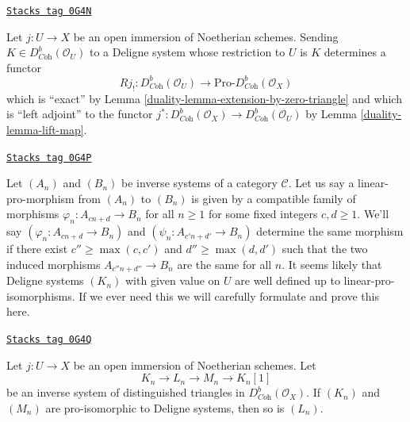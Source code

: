 \begin{remark}
\label{duality-remark-extension-by-zero}
\href{https://stacks.math.columbia.edu/tag/0G4N}{\texttt{Stacks tag 0G4N}}

Let $j : U \to X$ be an open immersion of Noetherian schemes.
Sending $K \in D^b_{\textit{Coh}}(\mathcal{O}_U)$ to a Deligne
system whose restriction to $U$ is $K$ determines a functor
$$
Rj_! :
D^b_{\textit{Coh}}(\mathcal{O}_U)
\longrightarrow
\text{Pro-}D^b_{\textit{Coh}}(\mathcal{O}_X)
$$
which is ``exact'' by Lemma \ref{duality-lemma-extension-by-zero-triangle} and
which is
``left adjoint'' to the functor
$j^* : D^b_{\textit{Coh}}(\mathcal{O}_X) \to
D^b_{\textit{Coh}}(\mathcal{O}_U)$ by Lemma \ref{duality-lemma-lift-map}.
\end{remark}

\begin{remark}
\label{duality-remark-extension-by-zero-linear-pro-system}
\href{https://stacks.math.columbia.edu/tag/0G4P}{\texttt{Stacks tag 0G4P}}

Let $(A_n)$ and $(B_n)$ be inverse systems of a category $\mathcal{C}$.
Let us say a linear-pro-morphism from $(A_n)$ to $(B_n)$ is given
by a compatible family of morphisms $\varphi_n : A_{cn + d} \to B_n$
for all $n \geq 1$ for some fixed integers $c, d \geq 1$.
We'll say $(\varphi_n : A_{cn + d} \to B_n)$ and
$(\psi_n : A_{c'n + d'} \to B_n)$ determine the same morphism
if there exist $c'' \geq \max(c, c')$ and $d'' \geq \max(d, d')$
such that the two induced morphisms $A_{c'' n + d''} \to B_n$ are the same
for all $n$. It seems likely that Deligne systems $(K_n)$ with given value on
$U$ are well defined up to linear-pro-isomorphisms. If we ever need this
we will carefully formulate and prove this here.
\end{remark}

\begin{lemma}
\label{duality-lemma-deligne-system-2-out-of-3}
\href{https://stacks.math.columbia.edu/tag/0G4Q}{\texttt{Stacks tag 0G4Q}}

Let $j : U \to X$ be an open immersion of Noetherian schemes.
Let
$$
K_n \to L_n \to M_n \to K_n[1]
$$
be an inverse system of distinguished triangles in
$D^b_{\textit{Coh}}(\mathcal{O}_X)$. If $(K_n)$ and $(M_n)$
are pro-isomorphic to Deligne systems, then so is $(L_n)$.
\end{lemma}

